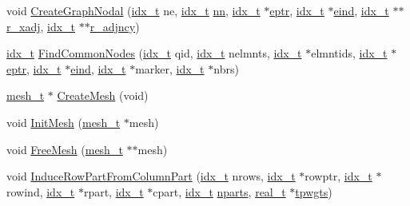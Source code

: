 \begin{DoxyCompactItemize}
void \hyperlink{a00945_ac6018a712a429b3c401adba913c2cae3}{Create\+Graph\+Nodal} (\hyperlink{a00876_aaa5262be3e700770163401acb0150f52}{idx\+\_\+t} ne, \hyperlink{a00876_aaa5262be3e700770163401acb0150f52}{idx\+\_\+t} \hyperlink{a00605_a29f8cac5eb66bce13c51cf794c698f74}{nn}, \hyperlink{a00876_aaa5262be3e700770163401acb0150f52}{idx\+\_\+t} $\ast$\hyperlink{a00879_af3ca47b5acd610d8d94e45e3480b2583}{eptr}, \hyperlink{a00876_aaa5262be3e700770163401acb0150f52}{idx\+\_\+t} $\ast$\hyperlink{a00879_af06d5753771b844d01c4c20e75c6401b}{eind}, \hyperlink{a00876_aaa5262be3e700770163401acb0150f52}{idx\+\_\+t} $\ast$$\ast$\hyperlink{a00879_ab92af26e448291b7932687dee45298df}{r\+\_\+xadj}, \hyperlink{a00876_aaa5262be3e700770163401acb0150f52}{idx\+\_\+t} $\ast$$\ast$\hyperlink{a00879_ad0152ea85617e06eb0e2d9f386150411}{r\+\_\+adjncy})
\item 
\hyperlink{a00876_aaa5262be3e700770163401acb0150f52}{idx\+\_\+t} \hyperlink{a00945_aa3fb3adf98a0168ead1ff715114ebea1}{Find\+Common\+Nodes} (\hyperlink{a00876_aaa5262be3e700770163401acb0150f52}{idx\+\_\+t} qid, \hyperlink{a00876_aaa5262be3e700770163401acb0150f52}{idx\+\_\+t} nelmnts, \hyperlink{a00876_aaa5262be3e700770163401acb0150f52}{idx\+\_\+t} $\ast$elmntids, \hyperlink{a00876_aaa5262be3e700770163401acb0150f52}{idx\+\_\+t} $\ast$\hyperlink{a00879_af3ca47b5acd610d8d94e45e3480b2583}{eptr}, \hyperlink{a00876_aaa5262be3e700770163401acb0150f52}{idx\+\_\+t} $\ast$\hyperlink{a00879_af06d5753771b844d01c4c20e75c6401b}{eind}, \hyperlink{a00876_aaa5262be3e700770163401acb0150f52}{idx\+\_\+t} $\ast$marker, \hyperlink{a00876_aaa5262be3e700770163401acb0150f52}{idx\+\_\+t} $\ast$nbrs)
\item 
\hyperlink{a00738}{mesh\+\_\+t} $\ast$ \hyperlink{a00945_aec1a4bd83e832be7befbf6b03e9513ad}{Create\+Mesh} (void)
\item 
void \hyperlink{a00945_a82cd62ea70eaae4395fee538d40cf12b}{Init\+Mesh} (\hyperlink{a00738}{mesh\+\_\+t} $\ast$mesh)
\item 
void \hyperlink{a00945_a64fe6e28f1752eb81b0314826921277d}{Free\+Mesh} (\hyperlink{a00738}{mesh\+\_\+t} $\ast$$\ast$mesh)
\item 
void \hyperlink{a00945_ae1253bac89c47d556436695e62bcfacd}{Induce\+Row\+Part\+From\+Column\+Part} (\hyperlink{a00876_aaa5262be3e700770163401acb0150f52}{idx\+\_\+t} nrows, \hyperlink{a00876_aaa5262be3e700770163401acb0150f52}{idx\+\_\+t} $\ast$rowptr, \hyperlink{a00876_aaa5262be3e700770163401acb0150f52}{idx\+\_\+t} $\ast$rowind, \hyperlink{a00876_aaa5262be3e700770163401acb0150f52}{idx\+\_\+t} $\ast$rpart, \hyperlink{a00876_aaa5262be3e700770163401acb0150f52}{idx\+\_\+t} $\ast$cpart, \hyperlink{a00876_aaa5262be3e700770163401acb0150f52}{idx\+\_\+t} \hyperlink{a00879_aad88065af88fd6759101788a8e15ce9e}{nparts}, \hyperlink{a00876_a1924a4f6907cc3833213aba1f07fcbe9}{real\+\_\+t} $\ast$\hyperlink{a00879_aa91786cd8ea996ec49ed5b382eb7fc2f}{tpwgts})
$$
\end{DoxyCompactItemize}
